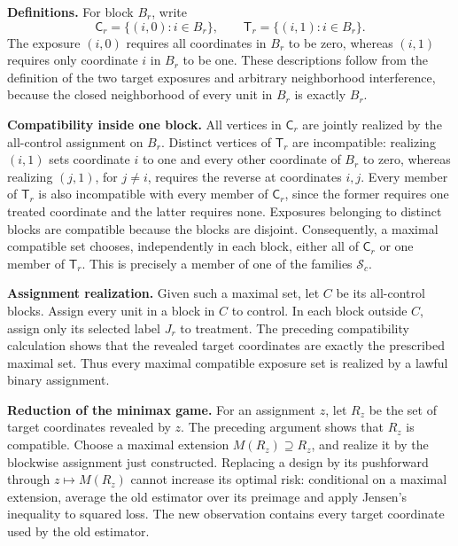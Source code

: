 \textbf{Definitions.}  For block \(B_r\), write
\[
\mathsf C_r=\{(i,0):i\in B_r\},
\qquad
\mathsf T_r=\{(i,1):i\in B_r\}.
\]
The exposure \((i,0)\) requires all coordinates in \(B_r\) to be zero, whereas \((i,1)\) requires only coordinate \(i\) in \(B_r\) to be one.  These descriptions follow from the definition of the two target exposures and arbitrary neighborhood interference, because the closed neighborhood of every unit in \(B_r\) is exactly \(B_r\).

\textbf{Compatibility inside one block.}  All vertices in \(\mathsf C_r\) are jointly realized by the all-control assignment on \(B_r\).  Distinct vertices of \(\mathsf T_r\) are incompatible: realizing \((i,1)\) sets coordinate \(i\) to one and every other coordinate of \(B_r\) to zero, whereas realizing \((j,1)\), for \(j\ne i\), requires the reverse at coordinates \(i,j\).  Every member of \(\mathsf T_r\) is also incompatible with every member of \(\mathsf C_r\), since the former requires one treated coordinate and the latter requires none.  Exposures belonging to distinct blocks are compatible because the blocks are disjoint.  Consequently, a maximal compatible set chooses, independently in each block, either all of \(\mathsf C_r\) or one member of \(\mathsf T_r\).  This is precisely a member of one of the families \(\mathcal S_c\).

\textbf{Assignment realization.}  Given such a maximal set, let \(C\) be its all-control blocks.  Assign every unit in a block in \(C\) to control.  In each block outside \(C\), assign only its selected label \(J_r\) to treatment.  The preceding compatibility calculation shows that the revealed target coordinates are exactly the prescribed maximal set.  Thus every maximal compatible exposure set is realized by a lawful binary assignment.

\textbf{Reduction of the minimax game.}  For an assignment \(z\), let \(R_z\) be the set of target coordinates revealed by \(z\).  The preceding argument shows that \(R_z\) is compatible.  Choose a maximal extension \(M(R_z)\supseteq R_z\), and realize it by the blockwise assignment just constructed.  Replacing a design by its pushforward through \(z\mapsto M(R_z)\) cannot increase its optimal risk: conditional on a maximal extension, average the old estimator over its preimage and apply Jensen's inequality to squared loss.  The new observation contains every target coordinate used by the old estimator.

